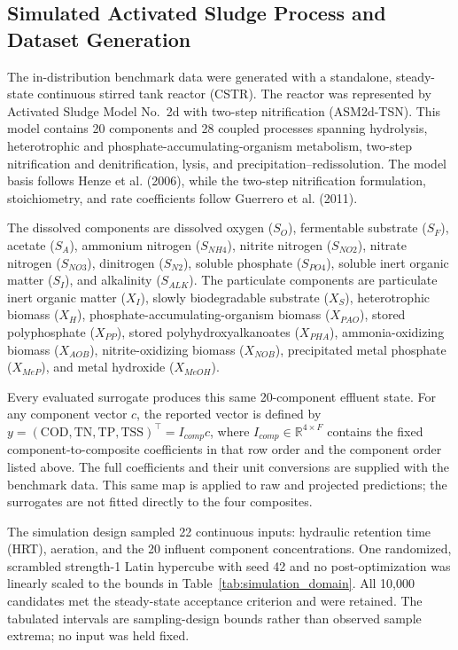 \documentclass[a4paper,fleqn]{cas-sc}
\begin{document}
\subsection{Simulated Activated Sludge Process and Dataset Generation}

The in-distribution benchmark data were generated with a standalone, steady-state continuous stirred tank reactor (CSTR). The reactor was represented by Activated Sludge Model No.\ 2d with two-step nitrification (ASM2d-TSN). This model contains 20 components and 28 coupled processes spanning hydrolysis, heterotrophic and phosphate-accumulating-organism metabolism, two-step nitrification and denitrification, lysis, and precipitation--redissolution. The model basis follows Henze et al. (2006), while the two-step nitrification formulation, stoichiometry, and rate coefficients follow Guerrero et al. (2011).

The dissolved components are dissolved oxygen ($S_O$), fermentable substrate ($S_F$), acetate ($S_A$), ammonium nitrogen ($S_{NH4}$), nitrite nitrogen ($S_{NO2}$), nitrate nitrogen ($S_{NO3}$), dinitrogen ($S_{N2}$), soluble phosphate ($S_{PO4}$), soluble inert organic matter ($S_I$), and alkalinity ($S_{ALK}$). The particulate components are particulate inert organic matter ($X_I$), slowly biodegradable substrate ($X_S$), heterotrophic biomass ($X_H$), phosphate-accumulating-organism biomass ($X_{PAO}$), stored polyphosphate ($X_{PP}$), stored polyhydroxyalkanoates ($X_{PHA}$), ammonia-oxidizing biomass ($X_{AOB}$), nitrite-oxidizing biomass ($X_{NOB}$), precipitated metal phosphate ($X_{MeP}$), and metal hydroxide ($X_{MeOH}$).

Every evaluated surrogate produces this same 20-component effluent state. For any component vector $c$, the reported vector is defined by
$y=(\mathrm{COD},\mathrm{TN},\mathrm{TP},\mathrm{TSS})^\top=I_{comp}c$,
where $I_{comp}\in\mathbb{R}^{4\times F}$ contains the fixed component-to-composite coefficients in that row order and the component order listed above. The full coefficients and their unit conversions are supplied with the benchmark data. This same map is applied to raw and projected predictions; the surrogates are not fitted directly to the four composites.

The simulation design sampled 22 continuous inputs: hydraulic retention time (HRT), aeration, and the 20 influent component concentrations. One randomized, scrambled strength-1 Latin hypercube with seed 42 and no post-optimization was linearly scaled to the bounds in Table~\ref{tab:simulation_domain}. All 10,000 candidates met the steady-state acceptance criterion and were retained. The tabulated intervals are sampling-design bounds rather than observed sample extrema; no input was held fixed.
\end{document}
